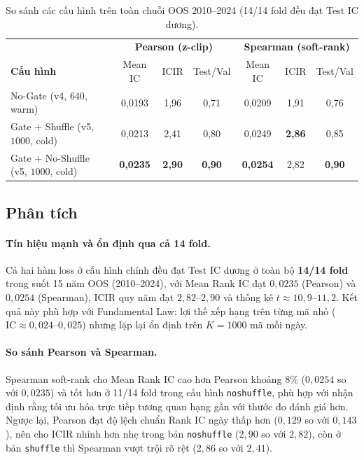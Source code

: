 \documentclass[a4paper,12pt]{article}
\begin{document}
\begin{table}[H]\centering\small
\caption{So sánh các cấu hình trên toàn chuỗi OOS 2010--2024 (14/14 fold đều đạt Test IC dương).}
\label{tab:gate}
\renewcommand{\arraystretch}{1.18}
\begin{tabular}{@{}l|ccc|ccc@{}}
\toprule
& \multicolumn{3}{c|}{\textbf{Pearson (z-clip)}} & \multicolumn{3}{c}{\textbf{Spearman (soft-rank)}}\\
\textbf{Cấu hình} & Mean IC & ICIR & Test/Val & Mean IC & ICIR & Test/Val\\\midrule
No-Gate (v4, $640$, warm) & 0,0193 & 1,96 & 0,71 & 0,0209 & 1,91 & 0,76\\
Gate + Shuffle (v5, $1000$, cold) & 0,0213 & 2,41 & 0,80 & 0,0249 & \textbf{2,86} & 0,85\\
Gate + No-Shuffle (v5, $1000$, cold) & \textbf{0,0235} & \textbf{2,90} & \textbf{0,90} & \textbf{0,0254} & 2,82 & \textbf{0,90}\\
\bottomrule
\end{tabular}
\end{table}

\subsection{Phân tích}
\paragraph{Tín hiệu mạnh và ổn định qua cả 14 fold.} Cả hai hàm loss ở cấu hình chính đều đạt Test IC dương ở toàn bộ \textbf{14/14 fold} trong suốt 15 năm OOS (2010--2024), với Mean Rank IC đạt $0{,}0235$ (Pearson) và $0{,}0254$ (Spearman), ICIR quy năm đạt $2{,}82$--$2{,}90$ và thống kê $t \approx 10{,}9$--$11{,}2$. Kết quả này phù hợp với Fundamental Law: lợi thế xếp hạng trên từng mã nhỏ ($\mathrm{IC}\approx 0{,}024$--$0{,}025$) nhưng lặp lại ổn định trên $K=1000$ mã mỗi ngày.

\paragraph{So sánh Pearson và Spearman.} Spearman soft-rank cho Mean Rank IC cao hơn Pearson khoảng $8\%$ ($0{,}0254$ so với $0{,}0235$) và tốt hơn ở 11/14 fold trong cấu hình \texttt{noshuffle}, phù hợp với nhận định rằng tối ưu hóa trực tiếp tương quan hạng gần với thước đo đánh giá hơn. Ngược lại, Pearson đạt độ lệch chuẩn Rank IC ngày thấp hơn ($0{,}129$ so với $0{,}143$), nên cho ICIR nhỉnh hơn nhẹ trong bản \texttt{noshuffle} ($2{,}90$ so với $2{,}82$), còn ở bản \texttt{shuffle} thì Spearman vượt trội rõ rệt ($2{,}86$ so với $2{,}41$).
\end{document}
